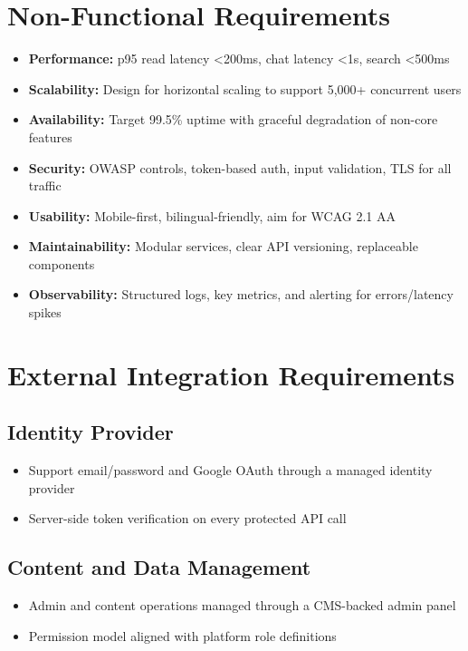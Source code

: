 \documentclass[a4paper,12pt]{article}
\begin{document}
\section{Non-Functional Requirements}

\begin{itemize}
    \item \textbf{Performance:} p95 read latency <200ms, chat latency <1s, search <500ms
    \item \textbf{Scalability:} Design for horizontal scaling to support 5,000+ concurrent users
    \item \textbf{Availability:} Target 99.5\% uptime with graceful degradation of non-core features
    \item \textbf{Security:} OWASP controls, token-based auth, input validation, TLS for all traffic
    \item \textbf{Usability:} Mobile-first, bilingual-friendly, aim for WCAG 2.1 AA
    \item \textbf{Maintainability:} Modular services, clear API versioning, replaceable components
    \item \textbf{Observability:} Structured logs, key metrics, and alerting for errors/latency spikes
\end{itemize}

\section{External Integration Requirements}

\subsection{Identity Provider}
\begin{itemize}
    \item Support email/password and Google OAuth through a managed identity provider
    \item Server-side token verification on every protected API call
\end{itemize}

\subsection{Content and Data Management}
\begin{itemize}
    \item Admin and content operations managed through a CMS-backed admin panel
    \item Permission model aligned with platform role definitions
\end{itemize}
\end{document}
